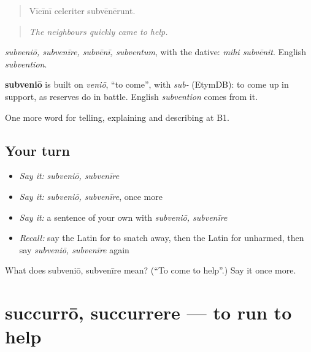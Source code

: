 \begin{quote}
Vīcīnī celeriter subvēnērunt.
\end{quote}

\begin{quote}
\emph{The neighbours quickly came to help.}
\end{quote}

\emph{subveniō, subvenīre, subvēnī, subventum}, with the dative: \emph{mihi subvēnit}. English \emph{subvention}.

\begin{cousinweb}
\textbf{subveniō} is built on \emph{veniō}, \textquotedblleft{}to come\textquotedblright{}, with \emph{sub-} (EtymDB): to come up in support, as reserves do in battle. English \emph{subvention} comes from it.
\end{cousinweb}

\begin{grammarlens}[title={What you've built}]
One more word for telling, explaining and describing at B1.
\end{grammarlens}

\subsection*{Your turn}
\begin{itemize}
\raggedright
  \item \emph{Say it:} \emph{subveniō, subvenīre}
  \item \emph{Say it:} \emph{subveniō, subvenīre}, once more
  \item \emph{Say it:} a sentence of your own with \emph{subveniō, subvenīre}
  \item \emph{Recall:} say the Latin for to snatch away, then the Latin for unharmed, then say \emph{subveniō, subvenīre} again
\end{itemize}

\begin{tcolorbox}[breakable,colback=teal!4,colframe=teal!35!black,title={Before you move on}]
What does subveniō, subvenīre mean? (\textquotedblleft{}To come to help\textquotedblright{}.) Say it once more.
\end{tcolorbox}
\section[succurrō, succurrere]{succurrō, succurrere — to run to help}

\label{lesson:LA-C316-succurro}



